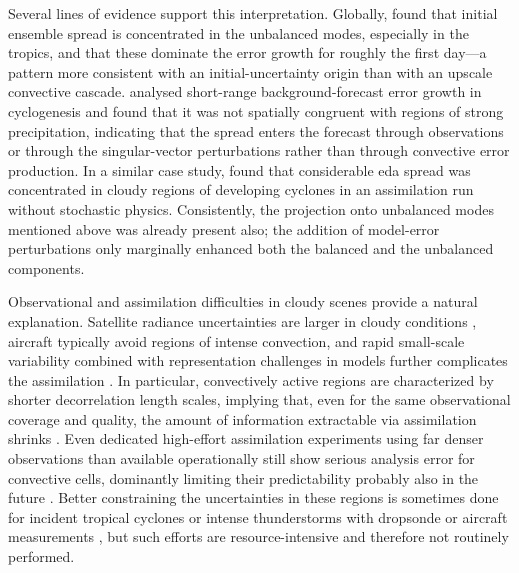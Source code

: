 Several lines of evidence support this interpretation. Globally,
\textcite{zagarBalancePropertiesShortrange2013,
    zagarThreedimensionalMultivariateModal2015,
    zagarGlobalPerspectiveLimits2017} found that initial ensemble
spread is concentrated in the unbalanced modes, especially in the tropics,
and that these dominate the error growth for roughly the first day---a
pattern more consistent with an initial-uncertainty origin than with an
upscale convective cascade. \textcite{rodwellUncertaintyGrowthForecast2023}
analysed short-range background-forecast error growth in cyclogenesis and found
that it was not spatially congruent with regions of strong precipitation,
indicating that the spread enters the forecast through observations or
through the singular-vector perturbations rather than through convective
error production. In a similar case study,
\textcite{cardinaliRepresentingModelError2014} found that
considerable \gls{eda} spread was concentrated in cloudy regions of developing
cyclones in an assimilation run without stochastic physics. Consistently,
the projection onto unbalanced modes mentioned above was already present also;
the addition of model-error perturbations only marginally enhanced both the
balanced and the unbalanced components.

Observational and assimilation difficulties in cloudy scenes provide a
natural explanation. Satellite radiance uncertainties are larger in cloudy
conditions \parencite{geerObservationErrorsAllsky2011,
    liAssimilationSatelliteSounder2016, geerAllskySatelliteData2018},
aircraft typically avoid regions of intense convection, and rapid
small-scale variability combined with representation challenges in models
further complicates the assimilation
\parencite{janjicRepresentationErrorData2018}.
In particular, convectively active regions are characterized by shorter
decorrelation length scales, implying that, even for the same observational
coverage and quality, the amount of information extractable via assimilation
shrinks \parencite{cardinaliPerformanceMeasurementAdvanced2011,
    leeBackgroundErrorStatistics2020,
    liComparisonTemperatureWind2023}. Even
dedicated high-effort assimilation experiments using far denser
observations than available operationally still show serious analysis error for
convective cells, dominantly limiting their predictability probably also in
the future \parencite{sodhiLimitsPracticalPredictability2025}. Better
constraining the uncertainties in these regions is sometimes done
for incident tropical cyclones or intense thunderstorms with
dropsonde or aircraft measurements \parencite{petersenImpactFutureBenefits2016},
but such efforts are resource-intensive and therefore not routinely performed.

